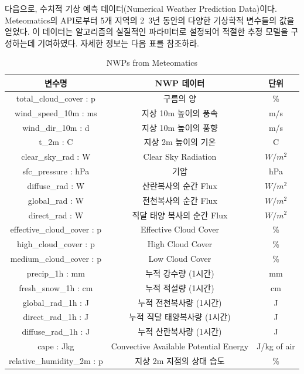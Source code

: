 \documentclass{article}
\begin{document}
다음으로, 수치적 기상 예측 데이터(Numerical Weather Prediction Data)이다. Meteomatics의 API로부터 5개 지역의 2~3년 동안의 다양한 기상학적 변수들의 값을 얻었다. 이 데이터는 알고리즘의 실질적인 파라미터로 설정되어 적절한 추정 모델을 구성하는데 기여하였다. 자세한 정보는 다음 표를 참조하라. \newline
\begin{table}[h]
    \begin{tabular}{@{}|c|c|c|@{}}
    \toprule
    \textbf{변수명}                & \textbf{NWP 데이터}                      & \textbf{단위} \\ \midrule
    total\_cloud\_cover : p     & 구름의 양                                 & \%          \\
    wind\_speed\_10m : ms       & 지상 10m 높이의 풍속                         & m/s         \\
    wind\_dir\_10m : d          & 지상 10m 높이의 풍향                         & m/s         \\
    t\_2m : C                   & 지상 2m 높이의 기온                          & C           \\
    clear\_sky\_rad : W         & Clear Sky Radiation                   & $W/m^2$     \\
    sfc\_pressure : hPa         & 기압                                    & hPa         \\
    diffuse\_rad : W            & 산란복사의 순간 Flux                         & $W/m^2$     \\
    global\_rad : W             & 전천복사의 순간 Flux                         & $W/m^2$     \\
    direct\_rad : W             & 직달 태양 복사의 순간 Flux                     & $W/m^2$     \\
    effective\_cloud\_cover : p & Effective Cloud Cover                 & \%          \\
    high\_cloud\_cover : p      & High Cloud Cover                      & \%          \\
    medium\_cloud\_cover : p    & Low Cloud Cover                       & \%          \\
    precip\_1h : mm             & 누적 강수량 (1시간)                          & mm          \\
    fresh\_snow\_1h : cm        & 누적 적설량 (1시간)                          & cm          \\
    global\_rad\_1h : J         & 누적 전천복사량 (1시간)                        & J           \\
    direct\_rad\_1h : J         & 누적 직달 태양복사량 (1시간)                     & J           \\
    diffuse\_rad\_1h : J        & 누적 산란복사량 (1시간)                        & J           \\
    cape : Jkg                  & Convective Available Potential Energy & J/kg of air \\
    relative\_humidity\_2m : p  & 지상 2m 지점의 상대 습도                       & \%          \\ \bottomrule
\end{tabular}
\caption{\label{tab:table_1}NWPs from Meteomatics}
\end{table}
\end{document}
